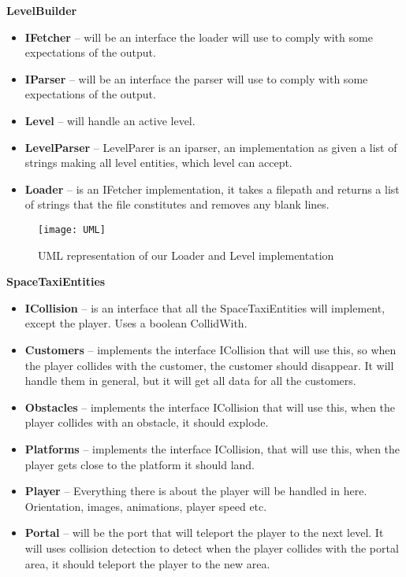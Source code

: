 \documentclass[../master.tex]{subfiles}
\begin{document}
\textbf{LevelBuilder}
\begin{itemize}
	\item[] \textbf{IFetcher} -- will be an interface the loader will use to comply with some expectations of the output.
	\item[] \textbf{IParser} -- will be an interface the parser will use to comply with some expectations of the output.
	\item[] \textbf{Level} -- will handle an active level.
	\item[] \textbf{LevelParser} -- LevelParer is an iparser, an implementation as given a list of strings making all level entities, which level can accept.
	\item[] \textbf{Loader} -- is an IFetcher implementation, it takes a filepath and returns a list of strings that the file constitutes and removes any blank lines.\\
\end{itemize}
\begin{figure}[H]
	\texttt{[image: UML]}
	\caption{UML representation of our Loader and Level implementation}
\end{figure}
\textbf{SpaceTaxiEntities}
\begin{itemize}
	\item[] \textbf{ICollision} -- is an interface that all the SpaceTaxiEntities will implement, except the player. Uses a boolean CollidWith.
	\item[] \textbf{Customers} -- implements the interface ICollision that will use this, so when the player collides with the customer, the customer should disappear. It will handle them in general, but it will get all data for all the customers.
	\item[] \textbf{Obstacles} -- implements the interface ICollision that will use this, when the player collides with an obstacle, it should explode.
	\item[] \textbf{Platforms} -- implements the interface ICollision, that will use this, when the player gets close to the platform it should land.
	\item[] \textbf{Player} -- Everything there is about the player will be handled in here. Orientation, images, animations, player speed etc.
	\item[] \textbf{Portal} -- will be the port that will teleport the player to the next level. It will uses collision detection to detect when the player collides with the portal area, it should teleport the player to the new area.\\
\end{itemize}
\end{document}
